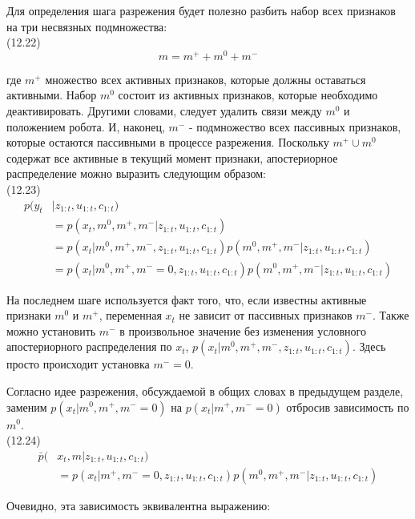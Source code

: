 \documentclass[10pt,a4paper]{article}
\begin{document}
Для определения шага разрежения будет полезно разбить набор всех признаков на три несвязных подмножества:\\

(12.22)
$$m=m^++m^0+m^-$$

где $m^+$ множество всех активных признаков, которые должны оставаться активными. Набор $m^0$ состоит из активных признаков, которые необходимо деактивировать. Другими словами, следует удалить связи между $m^0$ и положением робота. И, наконец, $m^-$  - подмножество всех пассивных признаков, которые остаются пассивными в процессе разрежения. Поскольку $m^+\cup m^0$ содержат все активные в текущий момент признаки, апостериорное распределение можно выразить следующим образом:\\

(12.23)
\begin{equation*}
\begin{split}
p(y_t&|z_{1:t},u_{1:t},c_{1:t})\\
&=p(x_t,m^0,m^+,m^-|z_{1:t},u_{1:t},c_{1:t})\\
&=p(x_t|m^0,m^+,m^-,z_{1:t},u_{1:t},c_{1:t})p(m^0,m^+,m^-|z_{1:t},u_{1:t},c_{1:t})\\
&=p(x_t|m^0,m^+,m^-=0,z_{1:t},u_{1:t},c_{1:t})p(m^0,m^+,m^-|z_{1:t},u_{1:t},c_{1:t})
\end{split}
\end{equation*}

На последнем шаге используется факт того, что, если известны активные признаки $m^0$ и $m^+$, переменная $x_t$ не зависит от пассивных признаков $m^-$. Также можно установить $m^-$ в произвольное значение без изменения условного апостериорного распределения по $x_t$, $p(x_t | m^0, m^+, m^-, z_{1:t}, u_{1:t}, c_{1:t})$. Здесь просто происходит установка $m^-=0$. 

Согласно идее разрежения, обсуждаемой в общих словах в предыдущем разделе, заменим $p(x_t | m^0, m^+, m^- = 0)$ на $p(x_t | m^+, m^- = 0)$ отбросив зависимость по $m^0$.\\

(12.24)
\begin{equation*}
\begin{split}
\bar{p}(&x_t,m|z_{1:t},u_{1:t},c_{1:t})\\
&=p(x_t|m^+,m^-=0,z_{1:t},u_{1:t},c_{1:t})p(m^0,m^+,m^-|z_{1:t},u_{1:t},c_{1:t})
\end{split}
\end{equation*}

Очевидно, эта зависимость эквивалентна выражению:\\
\end{document}
